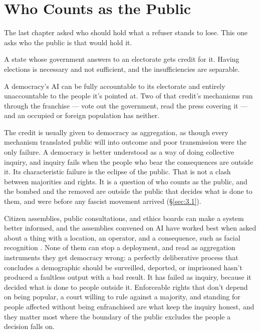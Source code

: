 \chapter{Who Counts as the Public}
\label{sec:17}
The last chapter asked who should hold what a refuser stands to lose. This one asks who the public is that would hold it.

A state whose government answers to an electorate gets credit for it. Having elections is necessary and not sufficient, and the insufficiencies are separable.

A democracy's AI can be fully accountable to its electorate and entirely unaccountable to the people it's pointed at. Two of that credit's mechanisms run through the franchise — vote out the government, read the press covering it — and an occupied or foreign population has neither.

The credit is usually given to democracy as aggregation, as though every mechanism translated public will into outcome and poor transmission were the only failure. A democracy is better understood as a way of doing collective inquiry, and inquiry fails when the people who bear the consequences are outside it.
Its characteristic failure is the eclipse of the public.
That is not a clash between majorities and rights. It is a question of who counts as the public, and the bombed and the removed are outside the public that decides what is done to them, and were before any fascist movement arrived (\S\ref{sec:3.1}).

Citizen assemblies, public consultations, and ethics boards can make a system better informed, and the assemblies convened on AI have worked best when asked about a thing with a location, an operator, and a consequence, such as facial recognition \autocite{adalovelaceinstitute2021biometrics}. None of them can stop a deployment, and read as aggregation instruments they get democracy wrong: a perfectly deliberative process that concludes a demographic should be surveilled, deported, or imprisoned hasn't produced a faultless output with a bad result. It has failed as inquiry, because it decided what is done to people outside it. Enforceable rights that don't depend on being popular, a court willing to rule against a majority, and standing for people affected without being enfranchised are what keep the inquiry honest, and they matter most where the boundary of the public excludes the people a decision falls on.

